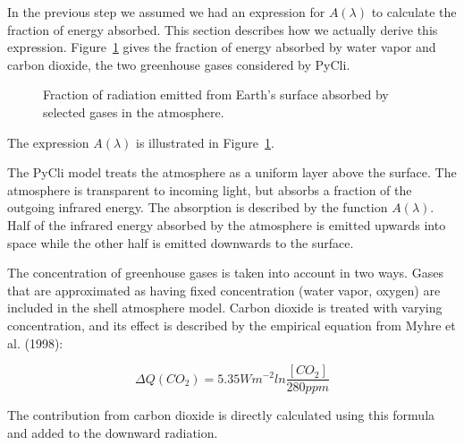 \documentclass[12pt]{article} %
\begin{document}
In the previous step we assumed we had an expression for $A(\lambda)$ to calculate the fraction of energy absorbed. This section describes how we actually derive this expression. Figure~\ref{fig:absorption} gives the fraction of energy absorbed by water vapor and carbon dioxide, the two greenhouse gases considered by PyCli.

\begin{figure}[H]
	\caption{Fraction of radiation emitted from Earth's surface absorbed by selected gases in the atmosphere.}
	\label{fig:absorption}
\end{figure}

The expression $A(\lambda)$ is illustrated in Figure~\ref{fig:absorption}.

The PyCli model treats the atmosphere as a uniform layer above the surface. The atmosphere is transparent to incoming light, but absorbs a fraction of the outgoing infrared energy. The absorption is described by the function $A(\lambda)$. Half of the infrared energy absorbed by the atmosphere is emitted upwards into space while the other half is emitted downwards to the surface.

The concentration of greenhouse gases is taken into account in two ways. Gases that are approximated as having fixed concentration (water vapor, oxygen) are included in the shell atmosphere model. Carbon dioxide is treated with varying concentration, and its effect is described by the empirical equation from Myhre et al. (1998):

$$\Delta Q (CO_2) = 5.35 W m^{-2} ln \frac{[CO_2]}{280ppm}$$

The contribution from carbon dioxide is directly calculated using this formula and added to the downward radiation.
\end{document}
